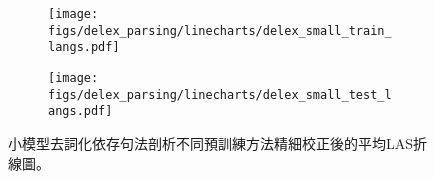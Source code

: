 \begin{figure}[htbp]
    \centering
    \begin{subfigure}[t]{\textwidth}
        \centering
        \texttt{[image: figs/delex\_parsing/linecharts/delex\_small\_train\_langs.pdf]}
    \end{subfigure}
    \vspace{-12pt}
    \begin{subfigure}[t]{\textwidth}
        \centering
        \texttt{[image: figs/delex\_parsing/linecharts/delex\_small\_test\_langs.pdf]}
    \end{subfigure}
    \caption{小模型去詞化依存句法剖析不同預訓練方法精細校正後的平均LAS折線圖。}
    \label{fig:delex_small_avg}
\end{figure}
